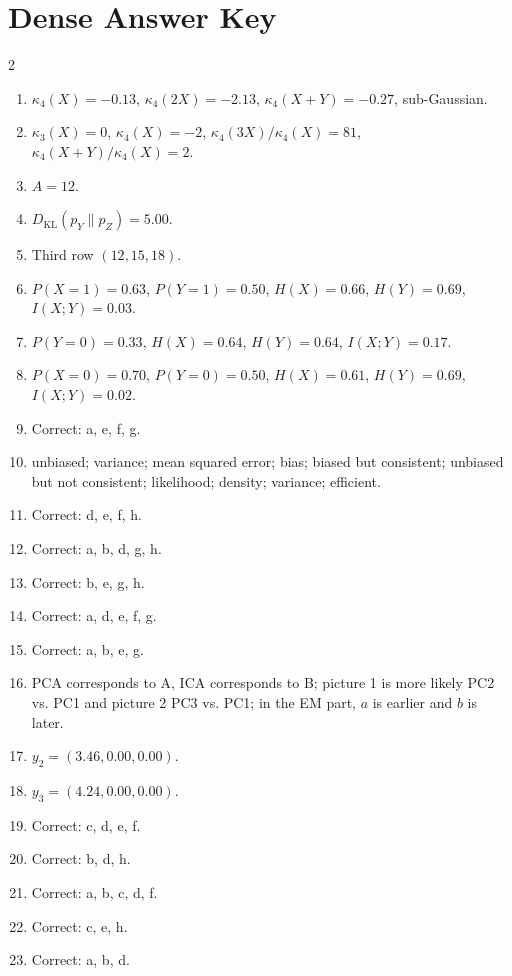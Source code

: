 \documentclass[11pt,oneside]{article}
\begin{document}
\newpage
\section{Dense Answer Key}

\begin{keybox}
\footnotesize
\begin{multicols}{2}
\begin{enumerate}[leftmargin=*,label=\textbf{Q\arabic*.}]
  \item $\kappa_4(X)=-0.13$, $\kappa_4(2X)=-2.13$, $\kappa_4(X+Y)=-0.27$, sub-Gaussian.
  \item $\kappa_3(X)=0$, $\kappa_4(X)=-2$, $\kappa_4(3X)/\kappa_4(X)=81$, $\kappa_4(X+Y)/\kappa_4(X)=2$.
  \item $A=12$.
  \item $D_{\mathrm{KL}}(p_Y\|p_Z)=5.00$.
  \item Third row $(12,15,18)$.
  \item $P(X=1)=0.63$, $P(Y=1)=0.50$, $H(X)=0.66$, $H(Y)=0.69$, $I(X;Y)=0.03$.
  \item $P(Y=0)=0.33$, $H(X)=0.64$, $H(Y)=0.64$, $I(X;Y)=0.17$.
  \item $P(X=0)=0.70$, $P(Y=0)=0.50$, $H(X)=0.61$, $H(Y)=0.69$, $I(X;Y)=0.02$.
  \item Correct: a, e, f, g.
  \item unbiased; variance; mean squared error; bias; biased but consistent; unbiased but not consistent; likelihood; density; variance; efficient.
  \item Correct: d, e, f, h.
  \item Correct: a, b, d, g, h.
  \item Correct: b, e, g, h.
  \item Correct: a, d, e, f, g.
  \item Correct: a, b, e, g.
  \item PCA corresponds to A, ICA corresponds to B; picture 1 is more likely PC2 vs. PC1 and picture 2 PC3 vs. PC1; in the EM part, $a$ is earlier and $b$ is later.
  \item $y_2=(3.46,0.00,0.00)$.
  \item $y_3=(4.24,0.00,0.00)$.
  \item Correct: c, d, e, f.
  \item Correct: b, d, h.
  \item Correct: a, b, c, d, f.
  \item Correct: c, e, h.
  \item Correct: a, b, d.

\end{enumerate}
\end{multicols}
\end{keybox}
\end{document}
